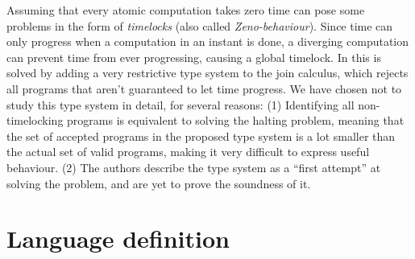 Assuming that every atomic computation takes zero time can pose some problems
in the form of \emph{timelocks} (also called \emph{Zeno-behaviour}). Since time
can only progress when a computation in an instant is done, a diverging
computation can prevent time from ever progressing, causing a global timelock.
In \cite{timed-join} this is solved by adding a very restrictive type system to
the join calculus, which rejects all programs that aren't guaranteed to let
time progress. We have chosen not to study this type system in detail, for
several reasons: (1) Identifying all non-timelocking programs is equivalent to
solving the halting problem, meaning that the set of accepted programs in the
proposed type system is a lot smaller than the actual set of valid programs,
making it very difficult to express useful behaviour. (2) The authors describe
the type system as a ``first attempt'' at solving the problem, and are yet to
prove the soundness of it.


\section{Language definition}
